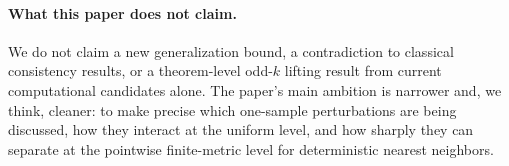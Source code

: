 \paragraph{What this paper does not claim.}
We do not claim a new generalization bound, a contradiction to classical
consistency results, or a theorem-level odd-$k$ lifting result from current
computational candidates alone.  The paper's main ambition is narrower and, we
think, cleaner: to make precise which one-sample perturbations are being
discussed, how they interact at the uniform level, and how sharply they can
separate at the pointwise finite-metric level for deterministic nearest
neighbors.


